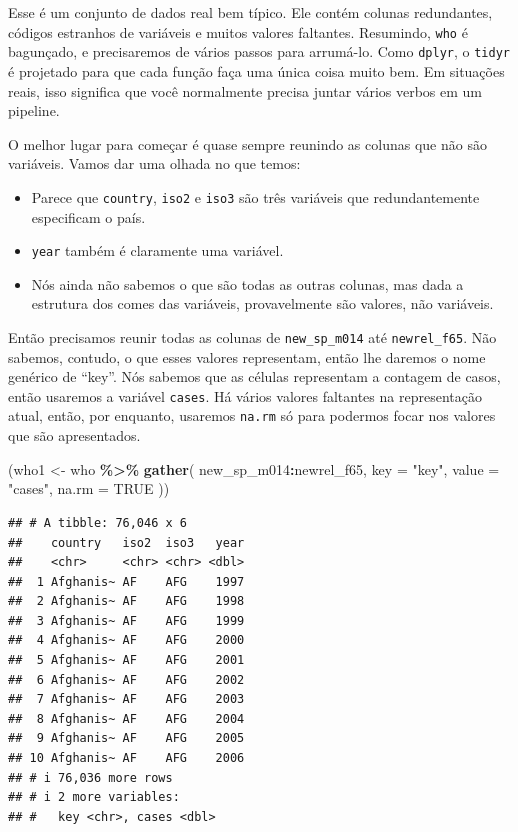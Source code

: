\documentclass[
]{latex/krantz}
\newenvironment{Shaded}{\begin{snugshade}}{\end{snugshade}}
\newcommand{\AttributeTok}[1]{\textcolor[rgb]{0.13,0.29,0.53}{#1}}
\newcommand{\ConstantTok}[1]{\textcolor[rgb]{0.56,0.35,0.01}{#1}}
\newcommand{\FunctionTok}[1]{\textcolor[rgb]{0.13,0.29,0.53}{\textbf{#1}}}
\newcommand{\NormalTok}[1]{#1}
\newcommand{\OtherTok}[1]{\textcolor[rgb]{0.56,0.35,0.01}{#1}}
\newcommand{\SpecialCharTok}[1]{\textcolor[rgb]{0.81,0.36,0.00}{\textbf{#1}}}
\newcommand{\StringTok}[1]{\textcolor[rgb]{0.31,0.60,0.02}{#1}}
\providecommand{\tightlist}{%
  \setlength{\itemsep}{0pt}\setlength{\parskip}{0pt}}
\theoremstyle{definition}
\theoremstyle{definition}
\theoremstyle{definition}
\theoremstyle{definition}
\theoremstyle{remark}
\begin{document}
Esse é um conjunto de dados real bem típico. Ele contém colunas redundantes, códigos estranhos de variáveis e muitos valores faltantes. Resumindo, \texttt{who} é bagunçado, e precisaremos de vários passos para arrumá-lo. Como \texttt{dplyr}, o \texttt{tidyr} é projetado para que cada função faça uma única coisa muito bem. Em situações reais, isso significa que você normalmente precisa juntar vários verbos em um pipeline.

O melhor lugar para começar é quase sempre reunindo as colunas que não são variáveis. Vamos dar uma olhada no que temos:

\begin{itemize}
\tightlist
\item
  Parece que \texttt{country}, \texttt{iso2} e \texttt{iso3} são três variáveis que redundantemente especificam o país.
\item
  \texttt{year} também é claramente uma variável.
\item
  Nós ainda não sabemos o que são todas as outras colunas, mas dada a estrutura dos comes das variáveis, provavelmente são valores, não variáveis.
\end{itemize}

Então precisamos reunir todas as colunas de \texttt{new\_sp\_m014} até \texttt{newrel\_f65}. Não sabemos, contudo, o que esses valores representam, então lhe daremos o nome genérico de ``key''. Nós sabemos que as células representam a contagem de casos, então usaremos a variável \texttt{cases}. Há vários valores faltantes na representação atual, então, por enquanto, usaremos \texttt{na.rm} só para podermos focar nos valores que são apresentados.

\begin{Shaded}
\begin{Highlighting}[]
\NormalTok{(who1 }\OtherTok{\textless{}{-}}\NormalTok{ who }\SpecialCharTok{\%\textgreater{}\%}
  \FunctionTok{gather}\NormalTok{(}
\NormalTok{    new\_sp\_m014}\SpecialCharTok{:}\NormalTok{newrel\_f65,}
    \AttributeTok{key =} \StringTok{"key"}\NormalTok{,}
    \AttributeTok{value =} \StringTok{"cases"}\NormalTok{,}
    \AttributeTok{na.rm =} \ConstantTok{TRUE}
\NormalTok{  ))}
\end{Highlighting}
\end{Shaded}

\begin{verbatim}
## # A tibble: 76,046 x 6
##    country   iso2  iso3   year
##    <chr>     <chr> <chr> <dbl>
##  1 Afghanis~ AF    AFG    1997
##  2 Afghanis~ AF    AFG    1998
##  3 Afghanis~ AF    AFG    1999
##  4 Afghanis~ AF    AFG    2000
##  5 Afghanis~ AF    AFG    2001
##  6 Afghanis~ AF    AFG    2002
##  7 Afghanis~ AF    AFG    2003
##  8 Afghanis~ AF    AFG    2004
##  9 Afghanis~ AF    AFG    2005
## 10 Afghanis~ AF    AFG    2006
## # i 76,036 more rows
## # i 2 more variables:
## #   key <chr>, cases <dbl>
\end{verbatim}
\end{document}
